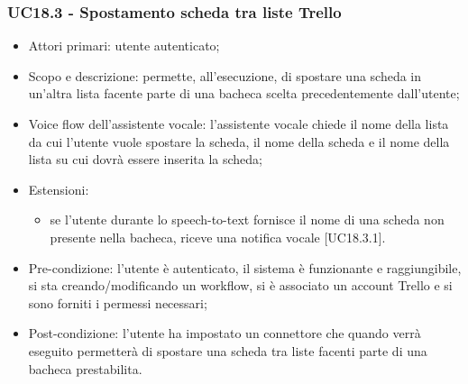 \subsubsection{UC18.3 - Spostamento scheda tra liste Trello}
\begin{itemize}
	\item  Attori primari: utente autenticato;
	\item  Scopo e descrizione: permette, all'esecuzione, di spostare una scheda in un'altra lista facente parte di una bacheca scelta precedentemente dall'utente;
	\item  Voice flow dell'assistente vocale: l'assistente vocale chiede il nome della lista da cui l'utente vuole spostare la scheda, il nome della scheda e il nome della lista su cui dovrà essere inserita la scheda;
	\item  Estensioni: 
		   \begin{itemize}
				\item se l'utente durante lo speech-to-text fornisce il nome di una scheda non presente nella bacheca, riceve una notifica vocale [UC18.3.1].
		   \end{itemize}
	\item  Pre-condizione: l'utente è autenticato, il sistema è funzionante e raggiungibile, si sta creando/modificando un workflow, si è associato un account Trello e si sono forniti i permessi necessari;
	\item  Post-condizione: l'utente ha impostato un connettore che quando verrà eseguito permetterà di spostare una scheda tra liste facenti parte di una bacheca prestabilita.
\end{itemize}
